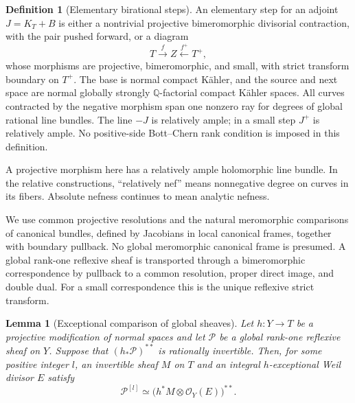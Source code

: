 \documentclass[11pt,letterpaper]{article}
\newtheorem{lemma}[theorem]{Lemma}
\theoremstyle{definition}
\newtheorem{definition}[theorem]{Definition}
\theoremstyle{remark}
\begin{document}
\begin{definition}[Elementary birational steps]
\label{bir:elementary}
An elementary step for an adjoint $J=K_T+B$ is either a nontrivial
projective bimeromorphic divisorial contraction, with the pair pushed
forward, or a diagram
\begin{equation}
 T\xrightarrow{f} Z\xleftarrow{f^+}T^+,
 \label{bir:small-diagram}
\end{equation}
whose morphisms are projective, bimeromorphic, and small, with strict
transform boundary on $T^+$.  The base is normal compact K\"ahler, and
the source and next space are normal globally strongly $\mathbb{Q}$-factorial
compact K\"ahler spaces.  All curves contracted by the negative
morphism span one nonzero ray for degrees of global rational line
bundles.  The line $-J$ is relatively ample; in a small step $J^+$ is
relatively ample.  No positive-side Bott--Chern rank condition is
imposed in this definition.
\end{definition}

A projective morphism here has a relatively ample holomorphic line
bundle.  In the relative constructions, ``relatively nef'' means
nonnegative degree on curves in its fibers.  Absolute nefness continues
to mean analytic nefness.

We use common projective resolutions and the natural meromorphic
comparisons of canonical bundles, defined by Jacobians in local
canonical frames, together with boundary pullback.  No global
meromorphic canonical frame is presumed.  A global rank-one reflexive
sheaf is transported through a bimeromorphic correspondence by
pullback to a common resolution, proper direct image, and double dual.
For a small correspondence this is the unique reflexive strict
transform.

\begin{lemma}[Exceptional comparison of global sheaves]
\label{bir:sheaf-comparison}
Let $h:Y\to T$ be a projective modification of normal spaces and let
$\mathcal P$ be a global rank-one reflexive sheaf on $Y$.  Suppose that
$(h_*\mathcal P)^{**}$ is rationally invertible.  Then, for some positive
integer $l$, an invertible sheaf $M$ on $T$ and an integral
$h$-exceptional Weil divisor $E$ satisfy
\begin{equation}
 \mathcal P^{[l]}\simeq
 \bigl(h^*M\otimes\mathcal{O}_Y(E)\bigr)^{**}.
 \label{bir:exceptional-sheaf}
\end{equation}
\end{lemma}
\end{document}
